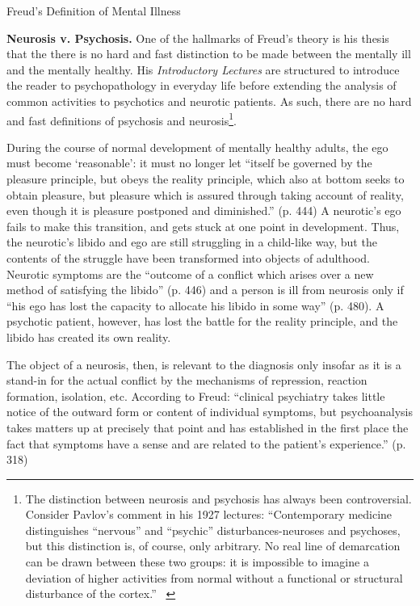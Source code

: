 \begin{refsection}
\begin{apatextbox}{Freud’s Definition of Mental Illness}
\label{def:freud}\end{apatextbox}

\textbf{Neurosis v. Psychosis.} One of the hallmarks of Freud's theory is his thesis that the there is no hard and fast distinction to be made between the mentally ill and the mentally healthy. His \emph{Introductory Lectures} are structured to introduce the reader to psychopathology in everyday life before extending the analysis of common activities to psychotics and neurotic patients. As such, there are no hard and fast definitions of psychosis and neurosis\footnote{The distinction between neurosis and psychosis has always been controversial. Consider Pavlov's comment in his 1927 lectures: “Contemporary medicine distinguishes ``nervous'' and ``psychic'' disturbances-neuroses and psychoses, but this distinction is, of course, only arbitrary. No real line of demarcation can be drawn between these two groups: it is impossible to imagine a deviation of higher activities from normal without a functional or structural disturbance of the cortex.” ~\citep[Lecture 23]{Pavlov:1946ws}}.

During the course of normal development of mentally healthy adults, the ego must become `reasonable': it must no longer let “itself be governed by the pleasure principle, but obeys the reality principle, which also at bottom seeks to obtain pleasure, but pleasure which is assured through taking account of reality, even though it is pleasure postponed and diminished.” (p. 444) A neurotic's ego fails to make this transition, and gets stuck at one point in development. Thus, the neurotic's libido and ego are still struggling in a child-like way, but the contents of the struggle have been transformed into objects of adulthood. Neurotic symptoms are the “outcome of a conflict which arises over a new method of satisfying the libido” (p. 446) and a person is ill from neurosis only if “his ego has lost the capacity to allocate his libido in some way” (p. 480). A psychotic patient, however, has lost the battle for the reality principle, and the libido has created its own reality.

The object of a neurosis, then, is relevant to the diagnosis only insofar as it is a stand-in for the actual conflict by the mechanisms of repression, reaction formation, isolation, etc. According to Freud: “clinical psychiatry takes little notice of the outward form or content of individual symptoms, but psychoanalysis takes matters up at precisely that point and has established in the first place the fact that symptoms have a sense and are related to the patient's experience.” (p. 318)


\end{refsection}
